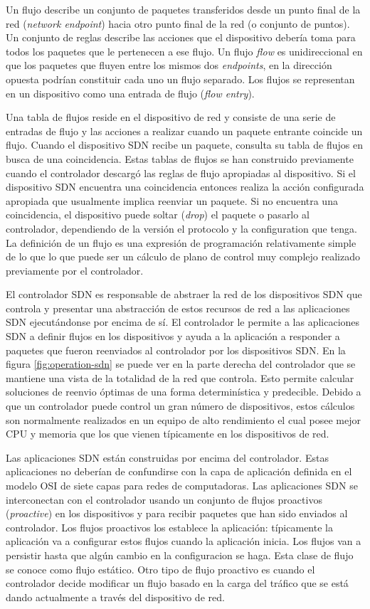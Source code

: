 \documentclass[10pt,journal,compsoc]{IEEEtran}
\begin{document}
Un flujo describe un conjunto de paquetes transferidos desde un punto final de la red (\emph{network endpoint}) hacia otro punto final de la red (o conjunto de puntos). Un conjunto de reglas describe las acciones que el dispositivo debería toma para todos los paquetes que le pertenecen a ese flujo. Un flujo \emph{flow} es unidireccional en que los paquetes que fluyen entre los mismos dos \emph{endpoints}, en la dirección opuesta podrían constituir cada uno un flujo separado. Los flujos se representan en un dispositivo como una entrada de flujo (\emph{flow entry}).

Una tabla de flujos reside en el dispositivo de red y consiste de una serie de entradas de flujo y las acciones a realizar cuando un paquete entrante coincide un flujo. Cuando el dispositivo SDN recibe un paquete, consulta su tabla de flujos en busca de una coincidencia. Estas tablas de flujos se han construido previamente cuando el controlador descargó las reglas de flujo apropiadas al dispositivo. Si el dispositivo SDN encuentra una coincidencia entonces realiza la acción configurada apropiada que usualmente implica reenviar un paquete. Si no encuentra una coincidencia, el dispositivo puede soltar (\emph{drop}) el paquete o pasarlo al controlador, dependiendo de la versión el protocolo y la configuration que tenga. La definición de un flujo es una expresión de programación relativamente simple de lo que lo que puede ser un cálculo de plano de control muy complejo realizado previamente por el controlador.

El controlador SDN es responsable de abstraer la red de los dispositivos SDN que controla y presentar una abstracción de estos recursos de red a las aplicaciones SDN ejecutándonse por encima de sí. El controlador le permite a las aplicaciones SDN a definir flujos en los dispositivos y ayuda a la aplicación a responder a paquetes que fueron reenviados al controlador por los dispositivos SDN. En la figura \ref{fig:operation-sdn} se puede ver en la parte derecha del controlador que se mantiene una vista de la totalidad de la red que controla. Esto permite calcular soluciones de reenvio óptimas de una forma determinística y predecible. Debido a que un controlador puede control un gran número de dispositivos, estos cálculos son normalmente realizados en un equipo de alto rendimiento el cual posee mejor CPU y memoria que los que vienen típicamente en los dispositivos de red.

Las aplicaciones SDN están construidas por encima del controlador. Estas aplicaciones no deberían de confundirse con la capa de aplicación definida en el modelo OSI de siete capas para redes de computadoras. Las aplicaciones SDN se interconectan con el controlador usando un conjunto de flujos proactivos (\emph{proactive}) en los dispositivos y para recibir paquetes que han sido enviados al controlador. Los flujos proactivos los establece la aplicación: típicamente la aplicación va a configurar estos flujos cuando la aplicación inicia. Los flujos van a persistir hasta que algún cambio en la configuracion se haga. Esta clase de flujo se conoce como flujo estático. Otro tipo de flujo proactivo es cuando el controlador decide modificar un flujo basado en la carga del tráfico que se está dando actualmente a través del dispositivo de red.
\end{document}
